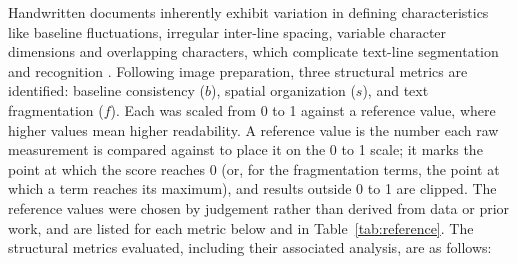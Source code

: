 \documentclass[conference]{IEEEtran}
\begin{document}
Handwritten documents inherently exhibit variation in defining characteristics
like baseline fluctuations, irregular inter-line spacing, variable character
dimensions and overlapping characters, which complicate text-line segmentation
and recognition \cite{papavassiliou2010, rabaev2026}. Following image
preparation, three structural metrics are identified: baseline consistency
($b$), spatial organization ($s$), and text fragmentation ($f$). Each was
scaled from 0 to 1 against a reference value, where higher values mean higher
readability.
A reference value is the number each raw measurement is compared against to
place it on the 0 to 1 scale; it marks the point at which the score reaches 0
(or, for the fragmentation terms, the point at which a term reaches its
maximum), and results outside 0 to 1 are clipped. The reference values were
chosen by judgement rather than derived from data or prior work, and are listed
for each metric below and in Table~\ref{tab:reference}.
The structural metrics evaluated, including their associated analysis, are as
follows:
\end{document}
